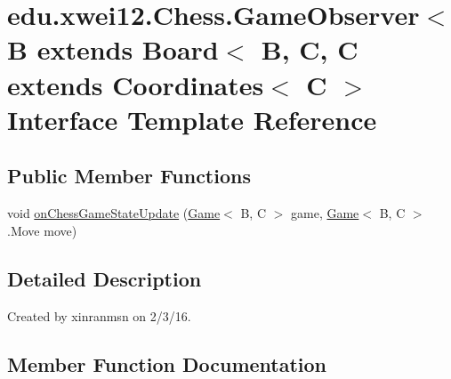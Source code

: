 \hypertarget{interfaceedu_1_1xwei12_1_1_chess_1_1_game_observer}{}\section{edu.\+xwei12.\+Chess.\+Game\+Observer$<$ B extends Board$<$ B, C, C extends Coordinates$<$ C $>$ Interface Template Reference}
\label{interfaceedu_1_1xwei12_1_1_chess_1_1_game_observer}
\subsection*{Public Member Functions}
\begin{DoxyCompactItemize}
\item 
void \hyperlink{interfaceedu_1_1xwei12_1_1_chess_1_1_game_observer_addac72acb49fd00ff4d514eafa41842b}{on\+Chess\+Game\+State\+Update} (\hyperlink{classedu_1_1xwei12_1_1_chess_1_1_game}{Game}$<$ B, C $>$ game, \hyperlink{classedu_1_1xwei12_1_1_chess_1_1_game}{Game}$<$ B, C $>$.Move move)
\end{DoxyCompactItemize}


\subsection{Detailed Description}
Created by xinranmsn on 2/3/16. 

\subsection{Member Function Documentation}
